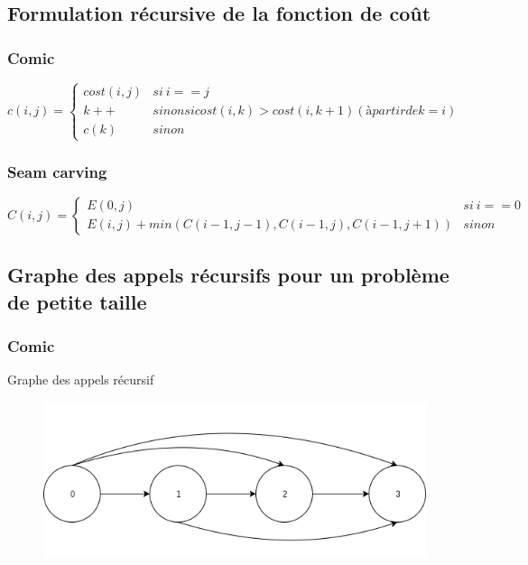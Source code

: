 \documentclass[10pt]{article}
\begin{document}
\subsection{Formulation récursive de la fonction de coût}
\subsubsection{Comic}
$$
c(i,j) = \left\{
	\begin{array}{ll}
		cost(i,j) & si\ i==j \\
		k++ & sinon si cost(i,k)>cost(i,k+1) (à partir de k=i)\\
		c(k) & sinon
	\end{array}
\right.
$$
\subsubsection{Seam carving}
$$
C(i,j) = \left\{
	\begin{array}{ll}
		E(0,j) & si\ i==0 \\
		E(i,j)+min(C(i-1,j-1),C(i-1,j),C(i-1,j+1)) & sinon
	\end{array}
\right.
$$

\subsection{Graphe des appels récursifs pour un problème de petite taille}
\subsubsection{Comic}
Graphe des appels récursif
 \begin{figure} [h]
      \centering
      \includegraphics[scale=0.5]{ComicDiagram.png}
   \end{figure}
\end{document}
